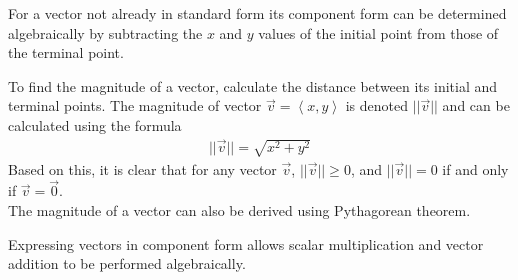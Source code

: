 \documentclass[a4paper]{article}
\let\bf\textbf
\newcommand{\la}{\left\langle}
\newcommand{\ra}{\right\rangle}
\begin{document}
\noindent For a vector not already in standard form its component form can be determined algebraically by subtracting the $x$ and $y$ values of the initial point from those of the terminal point.
\begin{center}
\end{center}
\noindent To find the magnitude of a vector, calculate the distance between its initial and terminal points. The magnitude of vector $\vec{v} = \la x, y \ra$ is denoted $||\vec{v}||$ and can be calculated using the formula
\begin{align*}
    ||\vec{v}|| = \sqrt{x^2 + y^2}
\end{align*}
Based on this, it is clear that for any vector $\vec{v}$, $||\vec{v}|| \geq 0$, and $||\vec{v}|| = 0$ if and only if $\vec{v} = \vec{0}$.\vspace{1mm}\\
The magnitude of a vector can also be derived using Pythagorean theorem.
\begin{center}
\end{center}
Expressing vectors in component form allows scalar multiplication and vector addition to be performed algebraically.
\begin{center}
\end{center}
\end{document}
